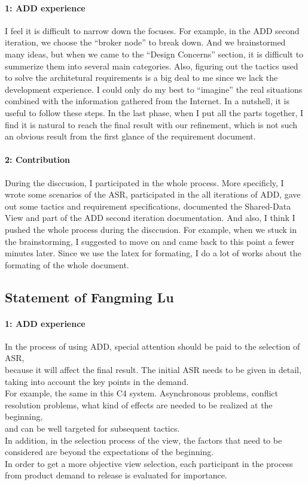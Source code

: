 \documentclass{article}
\begin{document}
	\paragraph{1: ADD experience}
	I feel it is difficult to narrow down the focuses. For example, in the ADD second iteration, we choose the “broker node” to break down. And we brainstormed many ideas, but when we came to the “Design Concerns” section, it is difficult to summerize them into several main categories.
Also, figuring out the tactics used to solve the architetural requirements is a big deal to me since we lack the development experience. I could only do my best to “imagine” the real situations combined with the information gathered from the Internet.
In a nutshell, it is useful to follow these steps. In the last phase, when I put all the parts together, I find it is natural to reach the final result with our refinement, which is not such an obvious result from the first glance of the requirement document.
	\paragraph{2: Contribution}
	During the disccusion, I participated in the whole process.
	More specificly, I wrote some scenarios of the ASR, participated in the all iterations of ADD, gave out some tactics and requirement specifications, documented the Shared-Data View and part of the ADD second iteration documentation.
	And also, I think I pushed the whole process during the disccusion. For example, when we stuck in the brainstorming, I suggested to move on and came back to this point a fewer minutes later. 
	Since we use the latex for formating, I do a lot of works about the formating of the whole document.

	\subsection{Statement of Fangming Lu}
	\paragraph{1: ADD experience}
		In the process of using ADD, special attention should be paid to the selection of ASR, \\
	because it will affect the final result. The initial ASR needs to be given in detail, taking into account the key points in the demand. \\
	For example, the same in this C4 system. Asynchronous problems, conflict resolution problems, what kind of effects are needed to be realized at the beginning, \\
	and can be well targeted for subsequent tactics.\\
	In addition, in the selection process of the view, the factors that need to be considered are beyond the expectations of the beginning. \\
	In order to get a more objective view selection, each participant in the process from product demand to release is evaluated for importance.\\
\end{document}

